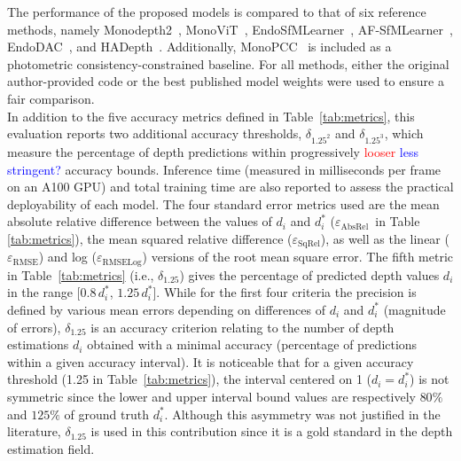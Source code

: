 \documentclass[a4paper,fleqn]{cas-dc}
\begin{document}
 The performance of the proposed models is compared to that of six reference methods, namely Monodepth2~\citep{Godard_ICCV_2019}, MonoViT~\citep{Zhao_3DV_2022}, 
EndoSfMLearner~\citep{Ozyoruk_MIA_2021}, AF-SfMLearner~\citep{Shao_MIA_2022}, EndoDAC~\citep{EndoDAC_MICCAI_2024}, and HADepth~\citep{HAdepth_2025}. Additionally, MonoPCC~\citep{wang2025monopcc}  is included as a photometric consistency-constrained baseline. For all methods, either the original author-provided code or the best published model weights were used to ensure a fair comparison. \\
%
In addition to the five accuracy metrics defined in Table~\ref{tab:metrics}, this evaluation reports 
two additional accuracy thresholds, $\delta_{1.25^2}$ and $\delta_{1.25^3}$, which measure the percentage 
of depth predictions within progressively \textcolor{red}{looser} \textcolor{blue}{less stringent?} accuracy bounds. Inference time (measured in milliseconds per frame on an A100 GPU) and total training time are also reported to assess the practical deployability of each model.
%
The four standard error metrics used are the mean absolute relative difference between the values of $d_i$ and $d_i^*$ ($\varepsilon_\textrm{AbsRel}$~in Table \ref{tab:metrics}), the mean squared relative difference ($\varepsilon_\textrm{SqRel}$), as well as the linear ($\varepsilon_\textrm{RMSE}$) and log ($\varepsilon_\textrm{RMSELog}$) versions  of the root mean square error. 
%
The fifth metric in Table~\ref{tab:metrics} (i.e., $\delta_{1.25}$)  gives the percentage of predicted depth values $d_i$  in the range  [$0.8\,d_i^*$, $1.25\,d_i^*$]. While for the first four criteria the precision is defined by various mean errors depending on differences of $d_i$ and $d_i^*$ (magnitude of errors), $\delta_{1.25}$ is an accuracy criterion relating to the number of depth estimations $d_i$ obtained with a minimal accuracy (percentage of predictions within a given accuracy interval). It is noticeable that for a given accuracy threshold (1.25 in Table~\ref{tab:metrics}), the interval centered on 1 ($d_i = d_i^*$) is not symmetric since the lower and upper interval bound values are respectively $80\%$ and $125\%$ of ground truth $d_i^*$. Although this asymmetry was not justified in the literature, $\delta_{1.25}$ is used in this contribution since it is a gold standard in the depth estimation field. \vspace*{1mm} \\ 
%
\end{document}
